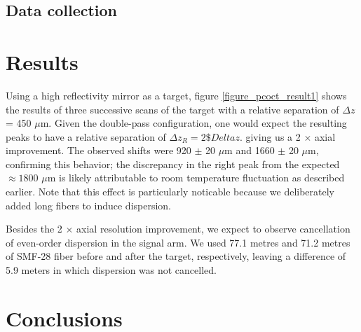 \subsection{Data collection}

\section{Results}

Using a high reflectivity mirror as a target, figure \ref{figure_pcoct_result1} shows the results of three successive scans of the target with a relative separation of $\Delta z$ = 450 $\mu$m. Given the double-pass configuration, one would expect the resulting peaks to have a relative separation of $\Delta z_R = 2 \$Delta z$. giving us a 2 $\times$ axial improvement. The observed shifts were 920 $\pm$ 20 $\mu$m and 1660 $\pm$ 20 $\mu$m, confirming this behavior; the discrepancy in the right peak from the expected $\approx 1800$ $\mu$m is likely attributable to room temperature fluctuation as described earlier. Note that this effect is particularly noticable because we deliberately added long fibers to induce dispersion.

Besides the 2 $\times$ axial resolution improvement, we expect to observe cancellation of even-order dispersion in the signal arm. We used 77.1 metres and 71.2 metres of SMF-28 fiber before and after the target, respectively, leaving a difference of 5.9 meters in which dispersion was not cancelled.


\section{Conclusions}

